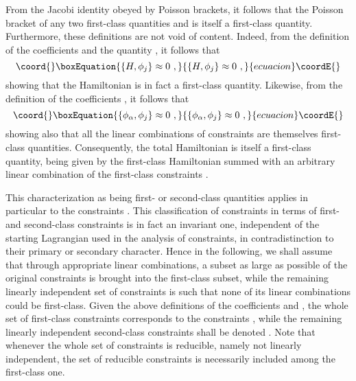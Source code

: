 \documentclass[a4paper,11pt]{article}
\begin{document}
From the Jacobi identity obeyed by Poisson brackets, it follows
that the Poisson bracket \coordHE{} of any two first-class
quantities \coordHE{} and \coordHE{} is itself a first-class quantity. Furthermore,
these definitions are not void of content. Indeed, from the definition
of the coefficients \coordHE{} and the quantity \coordHE{}, it follows that
\begin{equation}\coord{}\boxEquation{
\{H,\phi_j\}\approx 0\ ,
}{
\{H,\phi_j\}\approx 0\ ,
}{ecuacion}\coordE{}\end{equation}
showing that the Hamiltonian \coordHE{} is in fact a first-class quantity.
Likewise, from the definition of the coefficients \coordHE{}, it follows
that
\begin{equation}\coord{}\boxEquation{
\{\phi_\alpha,\phi_j\}\approx 0\ ,
}{
\{\phi_\alpha,\phi_j\}\approx 0\ ,
}{ecuacion}\coordE{}\end{equation}
showing also that all the linear combinations of constraints \myHighlight{$\phi_\alpha$}\coordHE{}
are themselves first-class quantities. Consequently, the total Hamiltonian
is itself a first-class quantity, being given by the first-class Hamiltonian
\coordHE{} summed with an arbitrary linear combination of the first-class
constraints \myHighlight{$\phi_\alpha$}\coordHE{}.

This characterization as being first- or second-class quantities
applies in particular to the constraints \coordHE{}. This classification
of constraints in terms of first- and second-class constraints is in fact
an invariant one, independent of the starting Lagrangian used in the analysis
of constraints, in contradistinction to their primary or secondary character.
Hence in the following, we shall assume that through appropriate
linear combinations, a subset as large as possible of the original constraints
\coordHE{} is brought into the first-class subset, while the remaining
linearly independent set of constraints is such that none of its linear
combinations could be first-class. Given the above definitions of the
coefficients \coordHE{} and \coordHE{}, the whole set of first-class
constraints corresponds to the constraints \myHighlight{$\phi_\alpha$}\coordHE{}, while the
remaining linearly independent
second-class constraints shall be denoted \coordHE{}. Note that
whenever the whole set of constraints \coordHE{} is reducible, namely
not linearly independent, the set of reducible constraints is necessarily
included among the first-class one.
\end{document}
